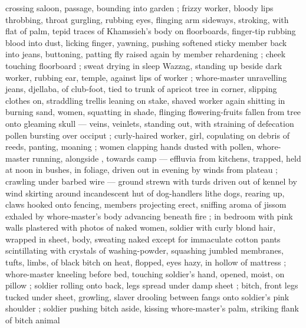 crossing saloon, passage, bounding into garden ; frizzy worker, bloody lips throbbing, throat gurgling, rubbing eyes, flinging arm sideways, stroking, with flat of palm, tepid traces of Khamssieh's body on floorboards, finger-tip rubbing blood into dust, licking finger, yawning, pushing softened sticky member back into jeans, buttoning, patting fly raised again by member rehardening ; cheek touching floorboard ; sweat drying in sleep {\semislash} Wazzag, standing up beside dark worker, rubbing ear, temple, against lips of worker  ; whore-master unravelling jeans, djellaba, of club-foot, tied to trunk of apricot tree in corner, slipping clothes on, straddling trellis {\col} leaning on stake, shaved worker again shitting in burning sand, women, squatting in shade, flinging flowering-fruits fallen from tree onto gleaming skull --- veins, veinlets, standing out, with straining of defecation {\dashcom} pollen bursting over occiput ; curly-haired worker, girl, copulating on debris of reeds, panting, moaning ; women clapping hands dusted with pollen, whore-master running, alongside , towards camp --- effluvia from kitchens, trapped, held at noon in bushes, in foliage, driven out in evening by winds from plateau ; crawling under barbed wire --- ground strewn with turds driven out of kennel by wind {\dashcom} skirting around incandescent hut of dog-handlers {\col} lithe dogs, rearing up, claws hooked onto fencing, members projecting erect, sniffing aroma of jissom exhaled by whore-master's body advancing beneath fire ; in bedroom with pink walls plastered with photos of naked women, soldier with curly blond hair, wrapped in sheet, body, sweating naked except for immaculate cotton pants scintillating with crystals of washing-powder, squashing jumbled membranes, tufts, limbs, of black bitch on heat, flopped, eyes hazy, in hollow of mattress ; whore-master kneeling before bed, touching soldier's hand, opened, moist, on pillow ; soldier rolling onto back, legs spread under damp sheet ; bitch, front legs tucked under sheet, growling, slaver drooling between fangs onto soldier's pink shoulder  ; soldier pushing bitch aside, kissing whore-master's palm, striking flank of bitch {\col} animal 
